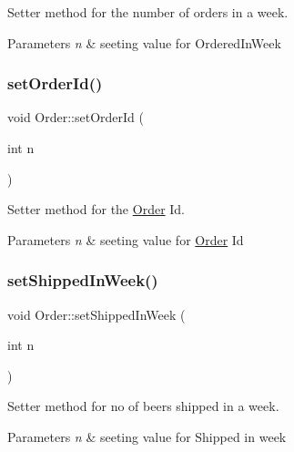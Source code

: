 Setter method for the number of orders in a week. 


\begin{DoxyParams}{Parameters}
{\em n} & seeting value for Ordered\+In\+Week \\
\hline
\end{DoxyParams}
\mbox{\label{class_order_abb0a14e231e3b3e0d3e59405e3dd9884}} 
\subsubsection{\texorpdfstring{set\+Order\+Id()}{setOrderId()}}
{\footnotesize\ttfamily void Order\+::set\+Order\+Id (\begin{DoxyParamCaption}\item[{int}]{n }\end{DoxyParamCaption})}



Setter method for the \hyperlink{class_order}{Order} Id. 


\begin{DoxyParams}{Parameters}
{\em n} & seeting value for \hyperlink{class_order}{Order} Id \\
\hline
\end{DoxyParams}
\mbox{\label{class_order_aac9de21348f84e2556101d52c0ec53af}} 
\subsubsection{\texorpdfstring{set\+Shipped\+In\+Week()}{setShippedInWeek()}}
{\footnotesize\ttfamily void Order\+::set\+Shipped\+In\+Week (\begin{DoxyParamCaption}\item[{int}]{n }\end{DoxyParamCaption})}



Setter method for no of beers shipped in a week. 


\begin{DoxyParams}{Parameters}
{\em n} & seeting value for Shipped in week \\
\hline
\end{DoxyParams}
\mbox{\label{class_order_aea921d19a1a5451eccc92b457c952fba}} 
